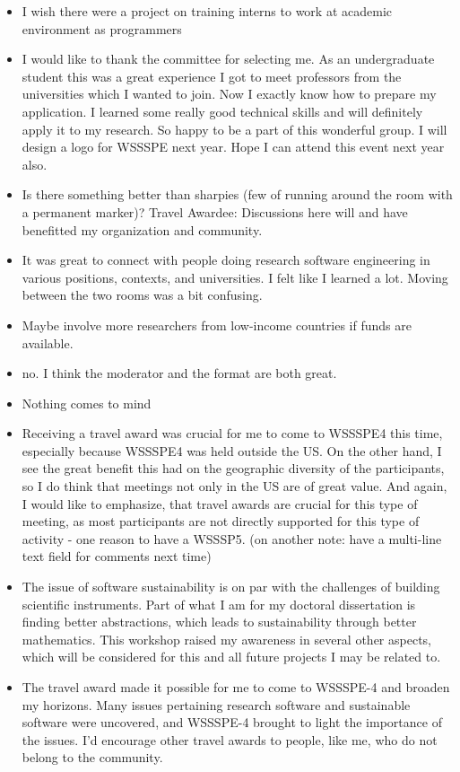 \begin{itemize}
\item I wish there were a project on training interns to work at academic environment as programmers
\item I would like to thank the committee for selecting me. As an undergraduate student this was a great experience I got to meet professors from the universities which I wanted to join. Now I exactly know how to prepare my application. I learned some really good technical skills and will definitely apply it to my research. So happy to be a part of this wonderful group. I will design a  logo for WSSSPE next year. Hope I can attend this event next year also.
\item Is there something better than sharpies (few of running around the room with a permanent marker)? Travel Awardee: Discussions here will and have benefitted my organization and community.
\item It was great to connect with people doing research software engineering in various positions, contexts, and universities. I felt like I learned a lot. Moving between the two rooms was a bit confusing.
\item Maybe involve more researchers from low-income countries if funds are available.
\item no. I think the moderator and the format are both great.
\item Nothing comes to mind
\item Receiving a travel award was crucial for me to come to WSSSPE4 this time, especially because WSSSPE4 was held outside the US. On the other hand, I see the great benefit this had on the geographic diversity of the participants, so I do think that meetings not only in the US are of great value. And again, I would like to emphasize, that travel awards are crucial for this type of meeting, as most participants are not directly supported for this type of activity - one reason to have a WSSSP5. (on another note: have a multi-line text field for comments next time)
\item The issue of software sustainability is on par with the challenges of building scientific instruments. Part of what I am for my doctoral dissertation is finding better abstractions, which leads to sustainability through better mathematics. This workshop raised my awareness in several other aspects, which will be considered for this and all future projects I may be related to.
\item The travel award made it possible for me to come to WSSSPE-4 and broaden my horizons.  Many issues pertaining research software and sustainable software were uncovered, and WSSSPE-4 brought to light the importance of the issues.  I'd encourage other travel awards to people, like me, who do not belong to the community.

\end{itemize}

